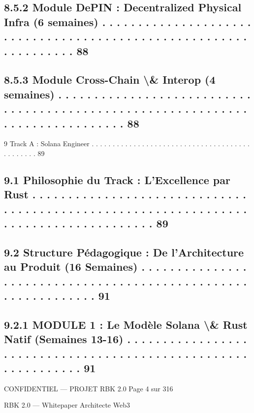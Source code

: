 \subsection{8.5.2              Module DePIN : Decentralized Physical Infra (6 semaines) . . . . . . . . . . . . . . . . . . . . . . . . . . . . . . . . . . . . . . . . . . . . . . . . . . . . . . . . . . . . . . . . . 88}
\subsection{8.5.3              Module Cross-Chain \textbackslash{}& Interop (4 semaines) . . . . . . . . . . . . . . . . . . . . . . . . . . . . . . . . . . . . . . . . . . . . . . . . . . . . . . . . . . . . . . . . . . . . . . . . . . . . . . 88}
\vspace{0.5em}
9     Track A : Solana Engineer . . . . . . . . . . . . . . . . . . . . . . . . . . . . . . . . . . . . . . . . . . . . . . 89\\
\subsection{9.1     Philosophie du Track : L’Excellence par Rust . . . . . . . . . . . . . . . . . . . . . . . . . . . . . . . . . . . . . . . . . . . . . . . . . . . . . . . . . . . . . . . . . . . . . . . . . . . . . . . . . . . . . 89}
\subsection{9.2     Structure Pédagogique : De l’Architecture au Produit (16 Semaines) . . . . . . . . . . . . . . . . . . . . . . . . . . . . . . . . . . . . . . . . . . . . . . . . . . . . . . . . . . . . . . 91}
\subsection{9.2.1              MODULE 1 : Le Modèle Solana \textbackslash{}& Rust Natif (Semaines 13-16) . . . . . . . . . . . . . . . . . . . . . . . . . . . . . . . . . . . . . . . . . . . . . . . . . . . . . . . . . . . . . . 91}
\vspace{0.5em}
\vspace{0.5em}
\vspace{0.5em}
\begin{confidential}CONFIDENTIEL — PROJET RBK 2.0                                                                            Page 4 sur 316\end{confidential}
RBK 2.0 — Whitepaper Architecte Web3\\
\vspace{0.5em}
\vspace{0.5em}
